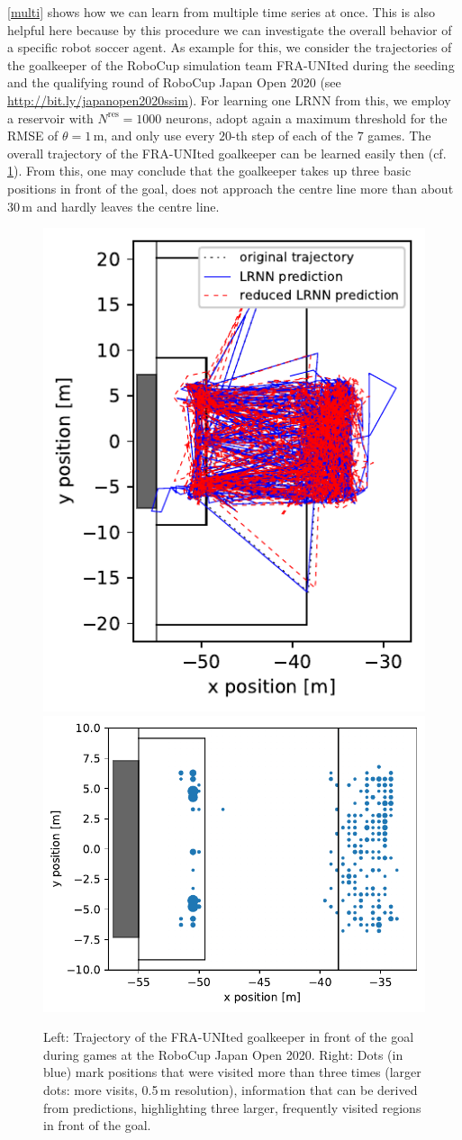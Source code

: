 \documentclass[twoside,11pt]{article}
\theoremstyle{definition}
\begin{document}
\cref{multi} shows how we can learn from multiple time series at once. This is
also helpful here because by this procedure we can investigate the overall
behavior of a specific robot soccer agent. As example for this, we consider the
trajectories of the goalkeeper of the RoboCup simulation team FRA-UNIted during
the seeding and the qualifying round of RoboCup Japan Open 2020 (see
\url{http://bit.ly/japanopen2020ssim}). For learning one LRNN from this, we employ a
reservoir with $N^\mathrm{res} = 1000$ neurons, adopt again a maximum threshold
for the RMSE of $\theta = 1$\,m, and only use every $20$-th step of each of the
$7$ games. The overall trajectory of the FRA-UNIted goalkeeper can be learned
easily then (cf. \cref{frankfurt}). From this, one may conclude that the
goalkeeper takes up three basic positions in front of the goal, does not
approach the centre line more than about 30\,m and hardly leaves the centre
line.

\begin{figure}
\centering
\hfill %
\includegraphics[width=0.34\columnwidth]{fig/goalie}     %
\hfill %
\includegraphics[width=0.57\columnwidth]{fig/goalievisits} %
\hfill %
\caption{Left: Trajectory of the FRA-UNIted goalkeeper in front of the goal
during games at the RoboCup Japan Open 2020. Right: Dots (in blue) mark positions
that were visited more than three times (larger dots: more visits, 0.5\,m resolution),
information that can be derived from predictions, highlighting three larger,
frequently visited regions in front of the goal.}
\label{frankfurt}
\end{figure}
\end{document}
